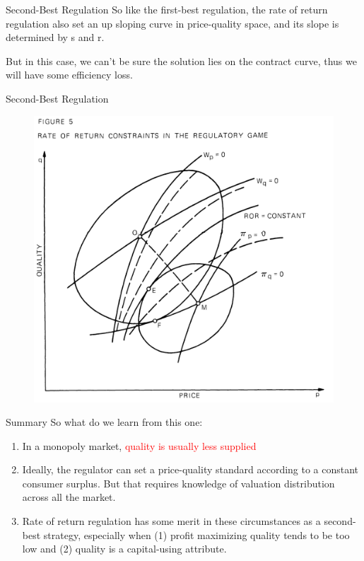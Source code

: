\documentclass[10pt]{beamer}
\begin{document}
\begin{frame}{Second-Best Regulation}
So like the first-best regulation, the rate of return regulation also set an up sloping curve in price-quality space, and its slope is determined by s and r.

But in this case, we can't be sure the solution lies on the contract curve, thus we will have some efficiency loss.
\end{frame}

\begin{frame}{Second-Best Regulation}
\begin{figure}
    \centering
    \includegraphics[width = .8\textwidth]{spence4.png}
    \label{fig:my_label}
\end{figure}
\end{frame}

\begin{frame}{Summary}
    So what do we learn from this one:
\begin{enumerate}
    \item In a monopoly market, \textcolor{red}{quality is usually less supplied}
    \item Ideally, the regulator can set a price-quality standard according to a constant consumer surplus. But that requires knowledge of valuation distribution across all the market.
    \item Rate of return regulation has some merit in these circumstances as a second-best strategy, especially when (1) profit maximizing quality tends to be too low and (2) quality is a capital-using attribute.
\end{enumerate}
\end{frame}
\end{document}
